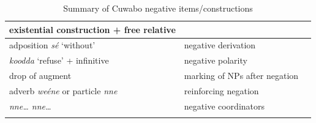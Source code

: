 \documentclass[output=paper,colorlinks=true, citecolor=brown,draftmode]{langscibook}
\begin{document}
\begin{table}
\begin{tabularx}{\textwidth}{lQp{13mm}}
{existential construction + free relative} &  & \\
\midrule
{adposition \textit{sé} ‘without’} &  {negative derivation } & {}\\
\tablevspace
{\textit{koodda} ‘refuse’ + infinitive} & {negative polarity } & {}\\
{drop of augment} & {marking of NPs after negation } & {}\\
\tablevspace
{adverb \textit{weéne} or particle \textit{nne}} & {reinforcing negation } & {}\\
\tablevspace
{\textit{nne… nne…}} & {negative coordinators } & {}\\
\lspbottomrule
\end{tabularx}
\caption{Summary of Cuwabo negative items/constructions}
\label{tab:cuw:7}
\end{table}
\end{document}

